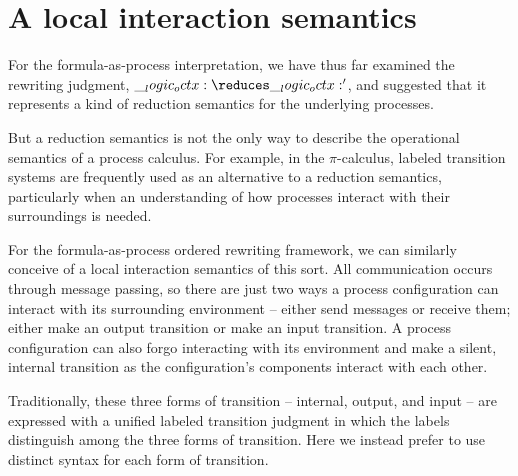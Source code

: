 

\section{A local interaction semantics}\label{sec:formula-as-process:local-interaction}\label{sec:formula-as-process:transition-semantics}

For the formula-as-process interpretation, we have thus far examined the rewriting judgment, $\octx \reduces \octx'$, and suggested that it represents a kind of reduction semantics for the underlying processes.

But a reduction semantics is not the only way to describe the operational semantics of a process calculus.
For example, in the $\pi$-calculus, labeled transition systems are frequently used as an alternative to a reduction semantics, particularly when an understanding of how processes interact with their surroundings is needed.

For the formula-as-process ordered rewriting framework, we can similarly conceive of a local interaction semantics of this sort.
All communication occurs through message passing, so there are just two ways a process configuration can interact with its surrounding environment -- either send messages or receive them; either make an output transition or make an input transition.
A process configuration can also forgo interacting with its environment and make a silent, internal transition as the configuration's components interact with each other.

Traditionally, these three forms of transition -- internal, output, and input -- are expressed with a unified labeled transition judgment in which the labels distinguish among the three forms of transition.
Here we instead prefer to use distinct syntax for each form of transition.


